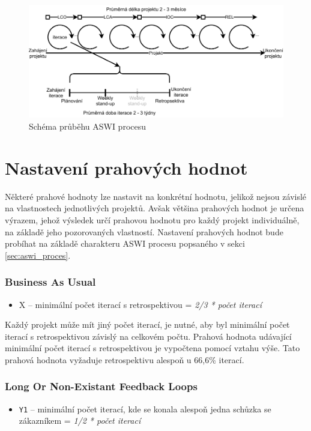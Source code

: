 \documentclass[czech,DP]{thesiskiv}
\begin{document}
 \begin{figure}[!htb]
    \centering
    \includegraphics[width=400pt]{img/aswi_proces.pdf}
    \caption{Schéma průběhu ASWI procesu}
    \label{img:aswi_proces}
\end{figure}
\FloatBarrier
\section{Nastavení prahových hodnot}
Některé prahové hodnoty lze nastavit na konkrétní hodnotu, jelikož nejsou závislé na vlastnostech jednotlivých projektů. Avšak většina prahových hodnot je určena výrazem, jehož výsledek určí prahovou hodnotu pro každý projekt individuálně, na základě jeho pozorovaných vlastností. Nastavení prahových hodnot bude probíhat na základě charakteru ASWI procesu popsaného v sekci \ref{sec:aswi_proces}.
\subsubsection{Business As Usual}
\begin{itemize}
    \item X – minimální počet iterací s retrospektivou = \textit{2/3 * počet iterací}
\end{itemize}
Každý projekt může mít jiný počet iterací, je nutné, aby byl minimální počet iterací s retrospektivou závislý na celkovém počtu. Prahová hodnota udávající minimální počet iterací s retrospektivou je vypočtena pomocí vztahu výše. Tato prahová hodnota vyžaduje retrospektivu alespoň u 66,6\% iterací.
\subsubsection{Long Or Non-Existant Feedback Loops}
\begin{itemize}
    \item \texttt{Y1} -- minimální počet iterací, kde se konala alespoň jedna schůzka se zákazníkem = \textit{1/2 * počet iterací}
\end{itemize}
\end{document}
